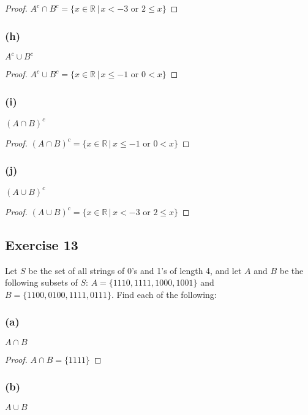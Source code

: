 \documentclass[14pt]{extarticle}
\newcommand{\R}{\mathbb{R}}
\begin{document}
\begin{proof}
  \(A^c \cap B^c = \{x \in \R \, | \, x < -3 \text{ or } 2 \leq x\}\)
\end{proof}

\subsubsection{(h)}
$A^c \cup B^c$

\begin{proof}
  \(A^c \cup B^c = \{x \in \R \, | \, x \leq -1 \text{ or } 0 < x\}\)
\end{proof}

\subsubsection{(i)}
$(A \cap B)^c$

\begin{proof}
  \((A \cap B)^c = \{x \in \R \, | \, x \leq -1 \text{ or } 0 < x\}\)
\end{proof}

\subsubsection{(j)}
$(A \cup B)^c$

\begin{proof}
  \((A \cup B)^c = \{x \in \R \, | \, x < -3 \text{ or } 2 \leq x\}\)
\end{proof}

\subsection{Exercise 13}
Let $S$ be the set of all strings of 0’s and 1’s of length 4, and let $A$ and $B$ be the following subsets of $S$:
\(A = \{1110, 1111, 1000, 1001\}\) and \(B = \{1100, 0100, 1111, 0111\}\). Find each of the following:

\subsubsection{(a)}
$A \cap B$

\begin{proof}
  \(A \cap B = \{1111\}\)
\end{proof}

\subsubsection{(b)}
$A \cup B$
\end{document}
